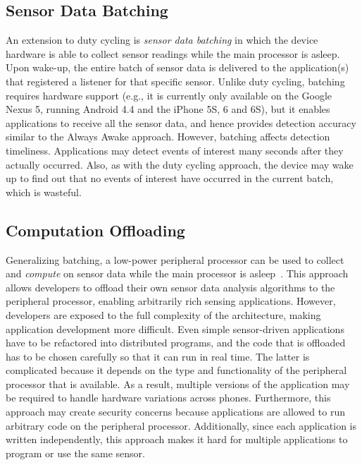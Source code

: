 \subsection{Sensor Data Batching}

An extension to duty cycling is \emph{sensor data batching} in which
the device hardware is able to collect sensor readings while the main
processor is asleep.  Upon wake-up, the entire batch of sensor data is
delivered to the application(s) that registered a listener for that
specific sensor.  Unlike duty cycling, batching requires hardware
support (e.g., it is currently only available on the 
Google Nexus 5, running Android 4.4 and the iPhone 5S, 6 and 6S), 
but it enables applications to
receive all the sensor data, and hence provides detection accuracy
similar to the Always Awake approach.  However, batching affects
detection timeliness.  Applications may detect events of interest many
seconds after they actually occurred.  Also, as with the duty cycling
approach, the device may wake up to find out that no events of
interest have occurred in the current batch, which is wasteful.

\subsection{Computation Offloading}
\label{subsec:computationOffloading}

Generalizing batching, a low-power peripheral processor can be used to
collect and \emph{compute} on sensor data while the main processor is
asleep~\cite{reflex,turducken}.  This approach allows developers to
offload their own sensor data analysis algorithms to the peripheral
processor, enabling arbitrarily rich sensing applications.  However,
developers are exposed to the full complexity of the architecture,
making application development more difficult.  Even simple
sensor-driven applications have to be refactored into distributed
programs, and the code that is offloaded has to be chosen
carefully so that it can run in real time.  The latter is complicated
because it depends on the type and functionality of the peripheral
processor that is available.  As a result, multiple versions of the
application may be required to handle hardware variations across
phones.  Furthermore, this approach may create security concerns
because applications are allowed to run arbitrary code on the
peripheral processor.  Additionally, since each application is written independently,
this approach makes it hard for multiple applications to program or
use the same sensor.

